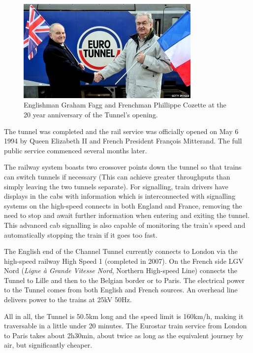 \documentclass[12pt]{article} %
\begin{document}
\begin{figure}[hp]
  \centering
  \includegraphics[width=0.8\textwidth]{20years}
  \caption{Englishman Graham Fagg and Frenchman Phillippe Cozette at the 20 year anniversary of the Tunnel's opening.}
  \label{fig:20y}
\end{figure}

The tunnel was completed and the rail service was officially opened on May 6 1994 by Queen Elizabeth II and French President François Mitterand. The full public service commenced several months later.

The railway system boasts two crossover points down the tunnel so that trains can switch tunnels if necessary (This can achieve greater throughputs than simply leaving the two tunnels separate). For signalling, train drivers have displays in the cabs with information which is interconnected with signalling systems on the high-speed connects in both England and France, removing the need to stop and await further information when entering and exiting the tunnel. This advanced cab signalling is also capable of monitoring the train's speed and automatically stopping the train if it goes too fast.

The English end of the Channel Tunnel currently connects to London via the high-speed railway High Speed 1 (completed in 2007). On the French side LGV Nord (\emph{Ligne à Grande Vitesse Nord}, Northern High-speed Line) connects the Tunnel to Lille and then to the Belgian border or to Paris. The electrical power to the Tunnel comes from both English and French sources. An overhead line delivers power to the trains at 25kV 50Hz.

All in all, the Tunnel is 50.5km long and the speed limit is 160km/h, making it traversable in a little under 20 minutes. The Eurostar train service from London to Paris takes about 2h30min, about twice as long as the equivalent journey by air, but significantly cheaper.
\end{document}

